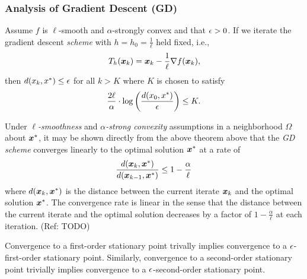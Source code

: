 \documentclass[10pt]{article}
\begin{document}
        
        \newpage

        \subsubsection*{Analysis of Gradient Descent (GD)}

            \begin{theorem} Assume $f$ is $\ell$-smooth and $\alpha$-strongly convex and that $\epsilon > 0$.
                If we iterate the gradient descent \emph{scheme} with $h = h_0 = \frac{1}{\ell}$ held fixed, i.e.,
                $$
                    T_{h}(\bm{x}_k) = \bm{x}_k - \frac{1}{\ell} \nabla f(\bm{x}_k),
                $$
                then $d(x_k, x^*) \leq \epsilon$ for all $k > K$ where $K$ is chosen to satisfy
                $$
                    \frac{2\ell}{\alpha} \cdot \log\left(\frac{d(x_0, x^*)}{\epsilon}\right) \leq K.
                $$
            \end{theorem}

            \begin{remark}
                Under \emph{$\ell$-smoothness} and \emph{$\alpha$-strong convexity} assumptions
                in a neighborhood $\Omega$ about $\bm{x}^*$, it may be shown directly from 
                the above theorem above that the \emph{GD scheme} converges linearly to 
                the optimal solution $\bm{x}^*$ at a rate of
                $$
                    \frac{d(\bm{x}_k, \bm{x}^*)}{d(\bm{x}_{k-1}, \bm{x}^*)} \leq 1 - \frac{\alpha}{\ell}
                $$
                where $d(\bm{x}_k, \bm{x}^*)$ is the distance between the current iterate $\bm{x}_k$ and 
                the optimal solution $\bm{x}^*$. The convergence rate is linear in the sense that the 
                distance between the current iterate and the optimal solution decreases by a factor of 
                $1 - \frac{\alpha}{\ell}$ at each iteration. (Ref: TODO)
            \end{remark}

            \begin{remark}
                Convergence to a first-order stationary point trivally
                implies convergence to a $\epsilon$-first-order stationary point.
                Similarly, convergence to a second-order stationary point trivially
                implies convergence to a $\epsilon$-second-order stationary point.
            \end{remark}

            \medskip
\end{document}
